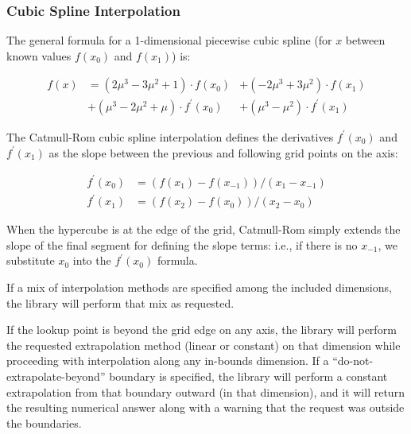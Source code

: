 \subsubsection{Cubic Spline
Interpolation}\label{cubic-spline-interpolation}

The general formula for a 1-dimensional piecewise cubic spline (for
\(x\) between known values \(f\left(x_0\right)\) and
\(f\left(x_1\right)\)) is:

\[\begin{array}{rll}
    f\left(x\right) &= \left(2\mu^3 - 3\mu^2 + 1\right) \cdot f\left(x_0\right)
    &+ \left(-2\mu^3 + 3\mu^2\right) \cdot f\left(x_1\right) \\
    &+ \left(\mu^3 - 2\mu^2 + \mu\right) \cdot f^\prime \left(x_0\right)
    &+ \left(\mu^3 - \mu^2\right) \cdot f^\prime \left(x_1\right)
\end{array}\]

The Catmull-Rom cubic spline interpolation defines the derivatives
\(f^\prime \left(x_0\right)\) and \(f^\prime\left(x_1\right)\) as the
slope between the previous and following grid points on the axis:

\[\begin{array}{rl}
    f^\prime(x_0) &= ( f(x_1) - f(x_{-1}) ) / ( x_1 - x_{-1}) \\
    f^\prime(x_1) &= ( f(x_2) - f(x_0) ) / ( x_2 - x_0)
\end{array}\]

When the hypercube is at the edge of the grid, Catmull-Rom simply
extends the slope of the final segment for defining the slope terms:
i.e., if there is no \(x_{-1}\), we substitute \(x_0\) into the
\(f^\prime(x_0)\) formula.

If a mix of interpolation methods are specified among the included
dimensions, the library will perform that mix as requested.

If the lookup point is beyond the grid edge on any axis, the library
will perform the requested extrapolation method (linear or constant) on
that dimension while proceeding with interpolation along any in-bounds
dimension. If a ``do-not-extrapolate-beyond'' boundary is specified, the
library will perform a constant extrapolation from that boundary outward
(in that dimension), and it will return the resulting numerical answer
along with a warning that the request was outside the boundaries.

